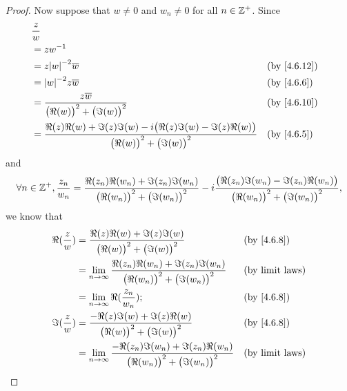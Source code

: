 \begin{proof}
  Now suppose that \(w \neq 0\) and \(w_n \neq 0\) for all \(n \in \mathbb{Z}^+\).
  Since
  \begin{align*}
     & \dfrac{z}{w}                                                                                                                                                \\
     & = z w^{-1}                                                                                                                                                  \\
     & = z \abs{w}^{-2} \overline{w}                                                                                                &  & \text{(by \cref{4.6.12})} \\
     & = \abs{w}^{-2} z \overline{w}                                                                                                &  & \by{4.6.6}                \\
     & = \dfrac{z \overline{w}}{\big(\Re(w)\big)^2 + \big(\Im(w)\big)^2}                                                            &  & \text{(by \cref{4.6.10})} \\
     & = \dfrac{\Re(z) \Re(w) + \Im(z) \Im(w) - i \big(\Re(z) \Im(w) - \Im(z) \Re(w)\big)}{\big(\Re(w)\big)^2 + \big(\Im(w)\big)^2} &  & \by{4.6.5}
  \end{align*}
  and
  \[
    \forall n \in \mathbb{Z}^+, \dfrac{z_n}{w_n} = \dfrac{\Re(z_n) \Re(w_n) + \Im(z_n) \Im(w_n)}{\big(\Re(w_n)\big)^2 + \big(\Im(w_n)\big)^2} - i \dfrac{\big(\Re(z_n) \Im(w_n) - \Im(z_n) \Re(w_n)\big)}{\big(\Re(w_n)\big)^2 + \big(\Im(w_n)\big)^2},
  \]
  we know that
  \begin{align*}
    \Re(\dfrac{z}{w}) & = \dfrac{\Re(z) \Re(w) + \Im(z) \Im(w)}{\big(\Re(w)\big)^2 + \big(\Im(w)\big)^2}                                   &  & \by{4.6.8}             \\
                      & = \lim_{n \to \infty} \dfrac{\Re(z_n) \Re(w_n) + \Im(z_n) \Im(w_n)}{\big(\Re(w_n)\big)^2 + \big(\Im(w_n)\big)^2}   &  & \text{(by limit laws)} \\
                      & = \lim_{n \to \infty} \Re(\dfrac{z_n}{w_n});                                                                       &  & \by{4.6.8}             \\
    \Im(\dfrac{z}{w}) & = \dfrac{- \Re(z) \Im(w) + \Im(z) \Re(w)}{\big(\Re(w)\big)^2 + \big(\Im(w)\big)^2}                                 &  & \by{4.6.8}             \\
                      & = \lim_{n \to \infty} \dfrac{- \Re(z_n) \Im(w_n) + \Im(z_n) \Re(w_n)}{\big(\Re(w_n)\big)^2 + \big(\Im(w_n)\big)^2} &  & \text{(by limit laws)} \\

\end{align*}
\end{proof}
